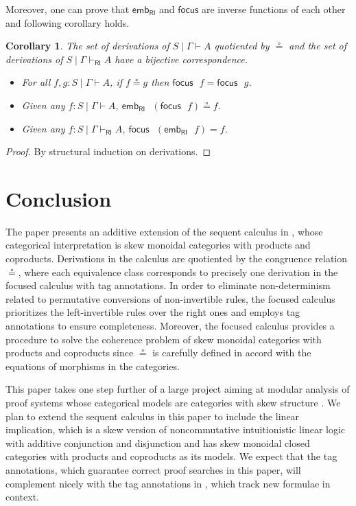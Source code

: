 \documentclass[submission,copyright,creativecommons]{eptcs}
\newtheorem{corollary}[theorem]{Corollary}
\theoremstyle{definition}
\newcommand{\RI}{\mathsf{RI}}
\begin{document}
Moreover, one can prove that $\mathsf{emb}_{\RI}$ and $\mathsf{focus}$ are inverse functions of each other and following corollary holds.
\begin{corollary}
  The set of derivations of $S \mid \Gamma \vdash A$ quotiented by $\circeq$ and the set of derivations of $S \mid \Gamma \vdash_{\RI} A$ have a bijective correspondence.
  \begin{itemize}
    \item For all $f, g : S \mid \Gamma \vdash A$, if $f \circeq g$ then $\mathsf{focus} \text{ } f = \mathsf{focus} \text{ } g$.
    \item Given any $f : S \mid \Gamma \vdash A$, $\mathsf{emb}_{\RI} \text{ } (\mathsf{focus} \text{ } f) \circeq f$.
    \item Given any $f : S \mid \Gamma \vdash_{\RI} A$, $\mathsf{focus} \text{ } (\mathsf{emb}_{\RI} \text{ } f) = f$.
  \end{itemize}
\end{corollary}
\begin{proof}
  By structural induction on derivations.
\end{proof}

\section{Conclusion}
The paper presents an additive extension of the sequent calculus in \cite{uustalu:sequent:2021}, whose categorical interpretation is skew monoidal categories with products and coproducts.
Derivations in the calculus are quotiented by the congruence relation $\circeq$, where each equivalence class corresponds to precisely one derivation in the focused calculus with tag annotations.
In order to eliminate non-determinism related to permutative conversions of non-invertible rules, the focused calculus prioritizes the left-invertible rules over the right ones and employs tag annotations to ensure completeness.
Moreover, the focused calculus provides a procedure to solve the coherence problem of skew monoidal categories with products and coproducts since $\circeq$ is carefully defined in accord with the equations of morphisms in the categories.
 
This paper takes one step further of a large project aiming at modular analysis of proof systems whose categorical models are categories with skew structure \cite{zeilberger:semiassociative:19, uustalu:sequent:2021,uustalu:proof:nodate,uustalu:deductive:nodate,veltri:coherence:2021,UVW:protsn}.
We plan to extend the sequent calculus in this paper to include the linear implication, which is a skew version of noncommutative intuitionistic linear logic with additive conjunction and disjunction and has skew monoidal closed categories with products and coproducts as its models.
We expect that the tag annotations, which guarantee correct proof searches in this paper, will complement nicely with the tag annotations in \cite{UVW:protsn}, which track new formulae in context.
\end{document}
